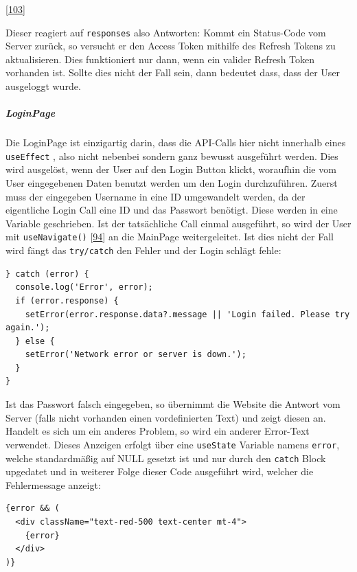 \documentclass[
    headings=optiontotocandhead,%
    twoside,
    numbers=noenddot,%
    12pt, %
    titlepage, %
    parskip=full, %
    listof=leveldown, 
    numbers=noenddot, %
    a4paper,DIV=14,
    BCOR=15mm,
]{scrbook}
\newcommand{\passthrough}[1]{#1}
\begin{document}
{[}\protect\hyperlink{ref-gpt-AxiosInterceptors}{103}{]}

Dieser reagiert auf \passthrough{\lstinline!responses!} also Antworten:
Kommt ein Status-Code vom Server zurück, so versucht er den Access Token
mithilfe des Refresh Tokens zu aktualisieren. Dies funktioniert nur
dann, wenn ein valider Refresh Token vorhanden ist. Sollte dies nicht
der Fall sein, dann bedeutet dass, dass der User ausgeloggt wurde.

\hypertarget{loginpage}{%
\subparagraph{LoginPage}\label{loginpage}}

Die LoginPage ist einzigartig darin, dass die API-Calls hier nicht
innerhalb eines \passthrough{\lstinline!useEffect!} , also nicht
nebenbei sondern ganz bewusst ausgeführt werden. Dies wird ausgelöst,
wenn der User auf den Login Button klickt, woraufhin die vom User
eingegebenen Daten benutzt werden um den Login durchzuführen. Zuerst
muss der eingegeben Username in eine ID umgewandelt werden, da der
eigentliche Login Call eine ID und das Passwort benötigt. Diese werden
in eine Variable geschrieben. Ist der tatsächliche Call einmal
ausgeführt, so wird der User mit \passthrough{\lstinline!useNavigate()!}
{[}\protect\hyperlink{ref-GeeksForGeeks-useNavigate}{94}{]} an die
MainPage weitergeleitet. Ist dies nicht der Fall wird fängt das
\passthrough{\lstinline!try/catch!} den Fehler und der Login schlägt
fehle:

\begin{lstlisting}[caption={Error-Handling in der LoginPage}]
} catch (error) {
  console.log('Error', error);
  if (error.response) {
    setError(error.response.data?.message || 'Login failed. Please try again.');
  } else {
    setError('Network error or server is down.');
  }
}
\end{lstlisting}

Ist das Passwort falsch eingegeben, so übernimmt die Website die Antwort
vom Server (falls nicht vorhanden einen vordefinierten Text) und zeigt
diesen an. Handelt es sich um ein anderes Problem, so wird ein anderer
Error-Text verwendet. Dieses Anzeigen erfolgt über eine
\passthrough{\lstinline!useState!} Variable namens
\passthrough{\lstinline!error!}, welche standardmäßig auf NULL gesetzt
ist und nur durch den \passthrough{\lstinline!catch!} Block upgedatet
und in weiterer Folge dieser Code ausgeführt wird, welcher die
Fehlermessage anzeigt:

\begin{lstlisting}[caption={Aufscheinen des Error Textes basierend auf boolean Variable error}]
{error && (
  <div className="text-red-500 text-center mt-4">
    {error}
  </div>
)}
\end{lstlisting}
\end{document}
